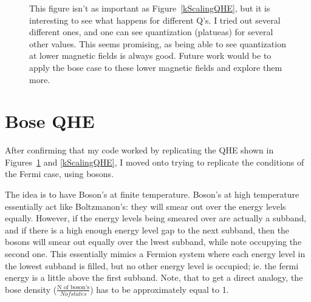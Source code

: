 \documentclass[12pt]{article}
\begin{document}
\begin{figure}[H]%
 	\centering
		\caption{This figure isn't as important as Figure~\ref{kScalingQHE}, but it is interesting to see what happens for different Q's. I tried out several different ones, and one can see quantization (platueas) for several other values. This seems promising, as being able to
		see quantization at lower magnetic fields is always good. Future work would be to apply the bose case to these lower magnetic fields and explore them more.}
         \label{QScalingQHE}
\end{figure}
\section{Bose QHE}
After confirming that my code worked by replicating the QHE shown in 
Figures~\ref{QScalingQHE} and \ref{kScalingQHE}, I moved onto trying to
replicate the conditions of the Fermi case, using bosons.

The idea is to have Boson's at finite temperature. Boson's at high temperature essentially act like Boltzmanon's: they will smear out over the
energy levels equally. However, if the energy levels being smeared over are actually a subband, and if there is a high enough energy level gap
to the next subband, then the bosons will smear out equally over the lwest subband, while note occupying the second one. This essentially mimics a Fermion system where each energy level in the lowest subband is filled, but no other energy level is occupied; ie. the fermi energy is a little above the first subband. Note, that to get a direct analogy,
the bose density ($\frac{\text{N of boson's}}{N of states}$) has to be approximately equal to 1.
\end{document}
